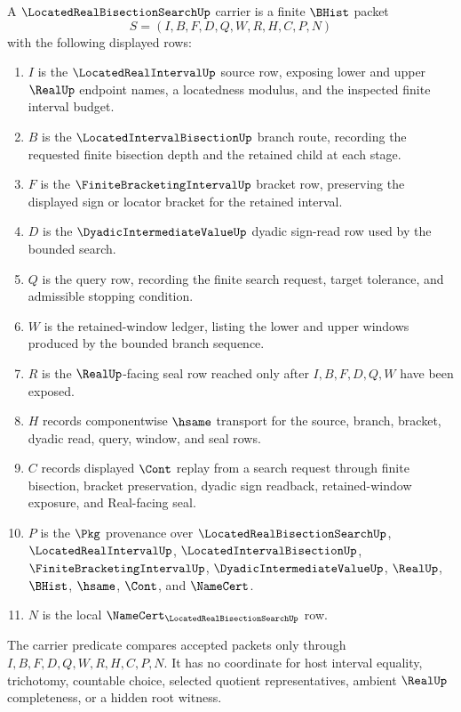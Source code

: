 \begin{definition}
\label{def:located-real-bisection-search-carrier}
A $\LocatedRealBisectionSearchUp$ carrier is a finite $\BHist$ packet
$$
S=(I,B,F,D,Q,W,R,H,C,P,N)
$$
with the following displayed rows:
\begin{enumerate}
\item $I$ is the $\LocatedRealIntervalUp$ source row, exposing lower and upper $\RealUp$ endpoint names, a locatedness modulus, and the inspected finite interval budget.
\item $B$ is the $\LocatedIntervalBisectionUp$ branch route, recording the requested finite bisection depth and the retained child at each stage.
\item $F$ is the $\FiniteBracketingIntervalUp$ bracket row, preserving the displayed sign or locator bracket for the retained interval.
\item $D$ is the $\DyadicIntermediateValueUp$ dyadic sign-read row used by the bounded search.
\item $Q$ is the query row, recording the finite search request, target tolerance, and admissible stopping condition.
\item $W$ is the retained-window ledger, listing the lower and upper windows produced by the bounded branch sequence.
\item $R$ is the $\RealUp$-facing seal row reached only after $I,B,F,D,Q,W$ have been exposed.
\item $H$ records componentwise $\hsame$ transport for the source, branch, bracket, dyadic read, query, window, and seal rows.
\item $C$ records displayed $\Cont$ replay from a search request through finite bisection, bracket preservation, dyadic sign readback, retained-window exposure, and Real-facing seal.
\item $P$ is the $\Pkg$ provenance over $\LocatedRealBisectionSearchUp$, $\LocatedRealIntervalUp$, $\LocatedIntervalBisectionUp$, $\FiniteBracketingIntervalUp$, $\DyadicIntermediateValueUp$, $\RealUp$, $\BHist$, $\hsame$, $\Cont$, and $\NameCert$.
\item $N$ is the local $\NameCert_{\LocatedRealBisectionSearchUp}$ row.
\end{enumerate}
The carrier predicate compares accepted packets only through $I,B,F,D,Q,W,R,H,C,P,N$. It has no coordinate for host interval equality, trichotomy, countable choice, selected quotient representatives, ambient $\RealUp$ completeness, or a hidden root witness.
\end{definition}

